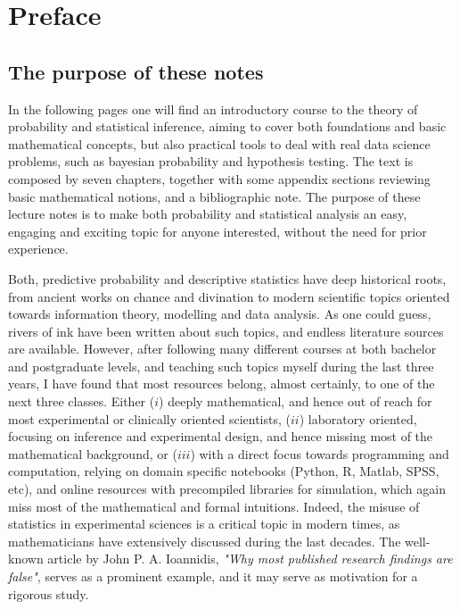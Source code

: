 \chapter{Preface}

\section*{The purpose of these notes}

In the following pages one will find an introductory course to the theory of probability and statistical inference, aiming to cover both foundations and basic mathematical concepts, but also practical tools to deal with real data science problems, such as bayesian probability and hypothesis testing. The text is composed by seven chapters, together with some appendix sections reviewing basic mathematical notions, and a bibliographic note. The purpose of these lecture notes is to make both probability and statistical analysis an easy, engaging and exciting topic for anyone interested, without the need for prior experience.

\medskip

Both, predictive probability and descriptive statistics have deep historical roots, from ancient works on chance and divination to modern scientific topics oriented towards information theory, modelling and data analysis. As one could guess, rivers of ink have been written about such topics, and endless literature sources are available. However, after following many different courses at both bachelor and postgraduate levels, and teaching such topics myself during the last three years, I have found that most resources belong, almost certainly, to one of the next three classes. Either ($i$) deeply mathematical, and hence out of reach for most experimental or clinically oriented scientists, ($ii$) laboratory oriented, focusing on inference and experimental design, and hence missing most of the mathematical background, or ($iii$) with a direct focus towards programming and computation, relying on domain specific notebooks (\textsf{Python}, \textsf{R}, \textsf{Matlab}, \textsf{SPSS}, etc), and online resources with precompiled libraries for simulation, which again miss most of the mathematical and formal intuitions. Indeed, the misuse of statistics in experimental sciences is a critical topic in modern times, as mathematicians have extensively discussed during the last decades. The well-known article by John P. A. Ioannidis, \textit{"Why most published research findings are false"}, serves as a prominent example, and it may serve as motivation for a rigorous study.

